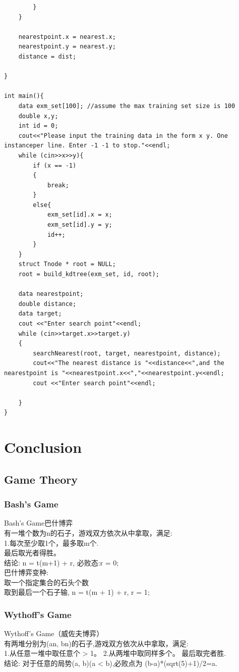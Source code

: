 \documentclass[10pt]{ctexart}
\begin{document}
{{\begin{lstlisting}
        }    
    }    
        
    nearestpoint.x = nearest.x;    
    nearestpoint.y = nearest.y;    
    distance = dist;    
        
}    
    
int main(){    
    data exm_set[100]; //assume the max training set size is 100    
    double x,y;    
    int id = 0;    
    cout<<"Please input the training data in the form x y. One instanceper line. Enter -1 -1 to stop."<<endl;    
    while (cin>>x>>y){    
        if (x == -1)    
        {    
            break;    
        }    
        else{    
            exm_set[id].x = x;    
            exm_set[id].y = y;    
            id++;    
        }    
    }    
    struct Tnode * root = NULL;    
    root = build_kdtree(exm_set, id, root);    
        
    data nearestpoint;    
    double distance;    
    data target;    
    cout <<"Enter search point"<<endl;    
    while (cin>>target.x>>target.y)    
    {    
        searchNearest(root, target, nearestpoint, distance);    
        cout<<"The nearest distance is "<<distance<<",and the nearestpoint is "<<nearestpoint.x<<","<<nearestpoint.y<<endl;    
        cout <<"Enter search point"<<endl;    
    
    }    
}
\end{lstlisting}

\newpage
\section{Conclusion}
\subsection{Game Theory}
\subsubsection{Bash's Game}
Bash's Game巴什博弈\\
有一堆个数为n的石子，游戏双方依次从中拿取，满足:\\
1.每次至少取1个，最多取m个.\\
最后取光者得胜。\\
结论: n = t(m+1) + r, 必败态:r = 0;\\
巴什博弈变种:\\
取一个指定集合的石头个数\\
取到最后一个石子输, n = t(m + 1)  + r, r = 1;\\
\subsubsection{Wythoff’s Game}
Wythoff’s Game（威佐夫博弈）\\
有两堆分别为(an, bn)的石子,游戏双方依次从中拿取，满足:\\
1.从任意一堆中取任意个 > 1。 
2.从两堆中取同样多个。
最后取完者胜.\\
结论: 对于任意的局势(a, b)(a < b),必败点为 (b-a)*(sqrt(5)+1)/2=a. \\
}}
\end{document}
